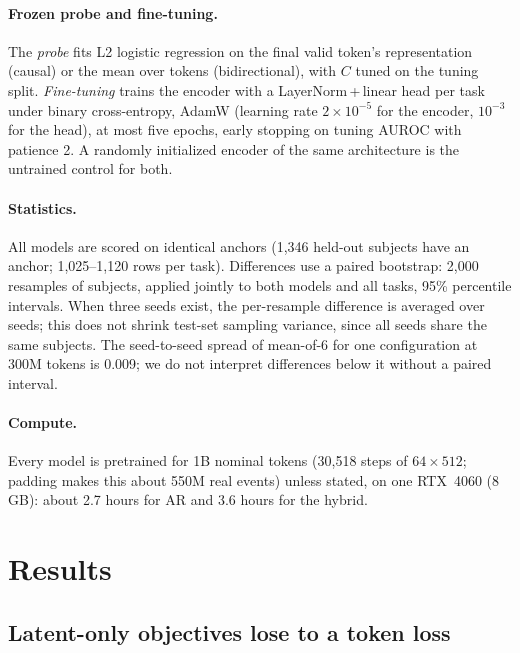 \documentclass[10pt,letterpaper]{article}
\begin{document}
\paragraph{Frozen probe and fine-tuning.}
The \emph{probe} fits L2 logistic regression on the final valid token's
representation (causal) or the mean over tokens (bidirectional), with $C$ tuned
on the tuning split. \emph{Fine-tuning} trains the encoder with a
LayerNorm\,+\,linear head per task under binary cross-entropy, AdamW
(learning rate $2\times10^{-5}$ for the encoder, $10^{-3}$ for the head), at most five epochs,
early stopping on tuning AUROC with patience 2. A randomly initialized encoder of the
same architecture is the untrained control for both.

\paragraph{Statistics.}
All models are scored on identical anchors (1{,}346 held-out subjects have an
anchor; 1{,}025--1{,}120 rows per task). Differences use a paired bootstrap:
2{,}000 resamples of subjects, applied jointly to both models and all tasks,
95\% percentile intervals. When three seeds exist, the per-resample difference
is averaged over seeds; this does not shrink test-set sampling variance, since
all seeds share the same subjects. The seed-to-seed spread of mean-of-6 for one
configuration at 300M tokens is 0.009; we do not interpret differences below it
without a paired interval.

\paragraph{Compute.}
Every model is pretrained for 1B nominal tokens (30{,}518 steps of $64\times512$;
padding makes this about 550M real events) unless stated, on one RTX~4060
(8\,GB): about 2.7 hours for AR and 3.6 hours for the hybrid.

\section{Results}
\label{sec:results}

\subsection{Latent-only objectives lose to a token loss}
\end{document}
